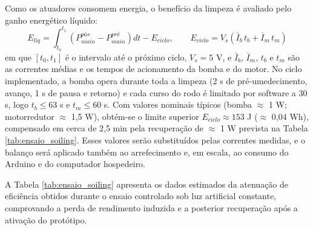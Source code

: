 \documentclass[a4paper,11pt]{article}
\begin{document}
Como os atuadores consomem energia, o benefício da limpeza é avaliado pelo ganho energético líquido:
\begin{equation} \label{eq:ganho_liquido}
E_{liq} = \int_{t_0}^{t_1} \left( P_{main}^{pós} - P_{main}^{pré} \right) dt - E_{ciclo}, \qquad E_{ciclo} = V_s \left( \bar{I}_b \, t_b + \bar{I}_m \, t_m \right)
\end{equation}
em que $[t_0, t_1]$ é o intervalo até o próximo ciclo, $V_s = 5$ V, e $\bar{I}_b$, $\bar{I}_m$, $t_b$ e $t_m$ são as correntes médias e os tempos de acionamento da bomba e do motor. No ciclo implementado, a bomba opera durante toda a limpeza (2 s de pré-umedecimento, avanço, 1 s de pausa e retorno) e cada curso do rodo é limitado por software a 30 s, logo $t_b \leq 63$ s e $t_m \leq 60$ s. Com valores nominais típicos (bomba $\approx$ 1 W; motorredutor $\approx$ 1,5 W), obtém-se o limite superior $E_{ciclo} \approx 153$ J ($\approx$ 0,04 Wh), compensado em cerca de 2,5 min pela recuperação de $\approx$ 1 W prevista na Tabela \ref{tab:ensaio_soiling}. Esses valores serão substituídos pelas correntes medidas, e o balanço será aplicado também ao arrefecimento e, em escala, ao consumo do Arduino e do computador hospedeiro.

A Tabela \ref{tab:ensaio_soiling} apresenta os dados estimados da atenuação de eficiência obtidos durante o ensaio controlado sob luz artificial constante, comprovando a perda de rendimento induzida e a posterior recuperação após a ativação do protótipo.

\begin{table}[htbp]
    \caption{Dados estimados para o ensaio de curto prazo com sujidade induzida sob luz artificial.}
    \vspace{.2cm}
    \centering
    \label{tab:ensaio_soiling}
\end{table}
\end{document}
